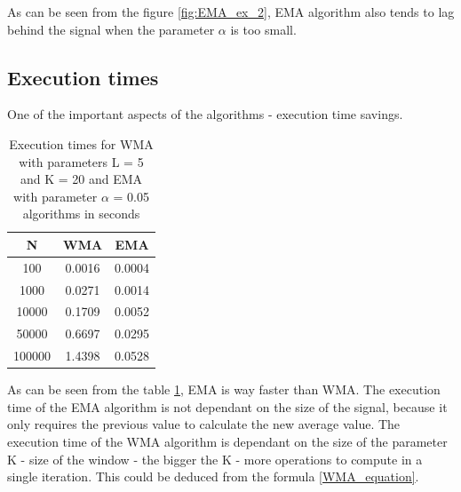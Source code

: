 \documentclass[a4paper,12pt,fleqn]{article}
\begin{document}
            As can be seen from the figure \ref{fig:EMA_ex_2}, EMA algorithm also tends to lag behind the signal when the
            parameter \begin{math}
                \alpha
                \end{math} is too small.
                \newpage
\subsection{Execution times}
One of the important aspects of the algorithms - execution time savings. 

\begin{table}[ht]
    \centering
    \begin{tabular}{|c|c|c|}
        \hline
        N & WMA & EMA \\
        \hline
        100 &0.0016 &0.0004 \\
        1000 &0.0271 &0.0014 \\
        10000 &0.1709 &0.0052 \\
        50000 &0.6697 &0.0295 \\
        100000 &1.4398 &0.0528 \\
        \hline
    \end{tabular}
    \caption{Execution times for WMA with parameters L = 5 and K = 20 and EMA with parameter $\alpha$ = 0.05 algorithms in seconds}
    \label{tab:execution_times}
\end{table}

As can be seen from the table \ref*{tab:execution_times}, EMA is way faster than
WMA. The execution time of the EMA algorithm is not dependant on the size of the signal, because it only requires the previous value to calculate the new average value. 
The execution time of the WMA algorithm is dependant on the size of the parameter K - size of the window - the bigger the K - more operations to compute in a single iteration. 
This could be deduced from the formula \ref{WMA_equation}.
\end{document}
